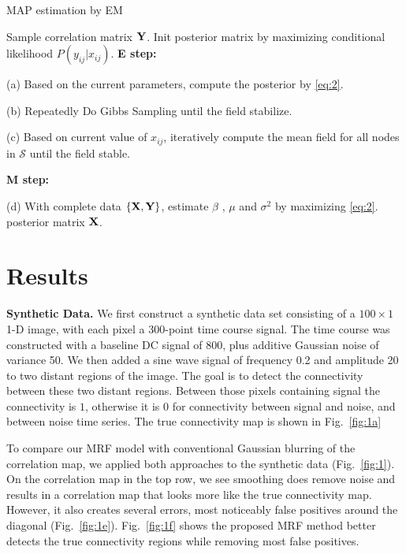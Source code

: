 \documentclass[runningheads,a4paper]{llncs}
\begin{document}
\begin{algorithm}[tbh]
  \caption{MAP estimation by EM}
  \label{alg:1}
  \begin{algorithmic}
    \REQUIRE Sample correlation matrix $\text{\bf Y}$.
    \STATE Init posterior matrix by maximizing conditional likelihood
    $P(y_{ij}|x_{ij})$.  
    \STATE \textbf{E step: }

    (a) Based on the current
    parameters, compute the posterior by \eqref{eq:2}.

    (b) Repeatedly Do Gibbs Sampling until the field  stabilize.

    (c) Based on current value of $x_{ij}$, iteratively compute the mean
    field for all nodes in $\mathcal{S}$ until the field stable.

    \STATE \textbf{M step: } 

    (d) With complete data $\{\text{\bf X}, \text{\bf Y}\}$, estimate $\beta$ , $\mu$ and $\sigma^2$ by maximizing
    \eqref{eq:2}.
    \ENDWHILE
    \RETURN posterior matrix $\text{\bf X}$.
  \end{algorithmic}
\end{algorithm}

\section{Results}
\label{sec:results}

{\bf Synthetic Data.} We first construct a synthetic data set consisting of a
$100\times 1$ 1-D image, with each pixel a 300-point time course signal. The
time course was constructed with a baseline DC signal of 800, plus additive
Gaussian noise of variance 50. We then added a sine wave signal of frequency 0.2
and amplitude 20 to two distant regions of the image. The goal is to detect the
connectivity between these two distant regions. Between those pixels containing
signal the connectivity is $1$, otherwise it is $0$ for connectivity between
signal and noise, and between noise time series. The true connectivity map is
shown in Fig.~\ref{fig:1a}

To compare our MRF model with conventional Gaussian blurring of the correlation
map, we applied both approaches to the synthetic data (Fig.~\ref{fig:1}). On the
correlation map in the top row, we see smoothing does remove noise and results
in a correlation map that looks more like the true connectivity map. However, it
also creates several errors, most noticeably false positives around the diagonal
(Fig.~\ref{fig:1e}). Fig.~\ref{fig:1f} shows the proposed MRF method better
detects the true connectivity regions while removing most false positives.
 
\end{document}
